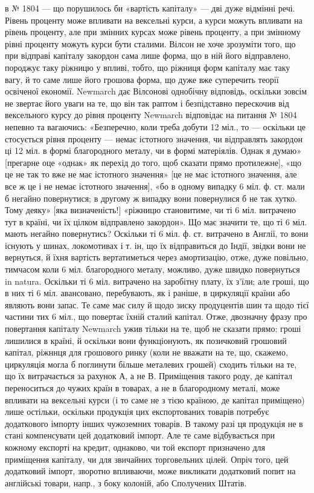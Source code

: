 \parcont{}  %
в № 1804 — що порушилось би «вартість капіталу» — дві дуже відмінні речі.
Рівень проценту може впливати на вексельні курси, а курси можуть впливати
на рівень проценту, але при змінних курсах може рівень проценту, а при змінному
рівні проценту можуть курси бути сталими. Вілсон не хоче зрозуміти того,
що при відправі капіталу закордон сама лише форма, що в ній його відправлено,
породжує таку ріжницю у впливі, тобто, що ріжниця форм капіталу має таку
вагу, й то саме лише його грошова форма, що дуже вже суперечить теорії
освіченої економії. Newmarch дає Вілсонові однобічну відповідь, оскільки зовсім
не звертає його уваги на те, що він так раптом і безпідставно перескочив від вексельного
курсу до рівня проценту Newmarch відповідає на питання № 1804
непевно та вагаючись: «Безперечно, коли треба добути 12 міл., то — оскільки
це стосується рівня проценту — немає істотного значення, чи відправлять
закордон ці 12 міл. в формі благородного металу, чи в формі матеріялів.
Однак я думаю» [прегарне оце «однак» як перехід до того, щоб сказати прямо
протилежне], «що це не так то вже не має істотного значення» [це не має істотного
значення, але все ж це і не немає істотного значення], «бо в одному
випадку 6 міл. ф. ст. мали б негайно повернутися; в другому ж випадку вони
повернулися б не так хутко. Тому деяку» [яка визначеність!] «ріжницю становитиме,
чи ті 6 міл. витрачено тут в країні, чи їх цілком відправлено закордон».
Що має значити те, що ті 6 міл. мають негайно повернутись? Оскільки
ті 6 міл. ф. ст. витрачено в Англії, то вони існують у шинах, локомотивах і т. ін,
що їх відправиться до Індії, звідки вони не вернуться, й їхня вартість вертатиметься
через амортизацію, отже, дуже повільно, тимчасом коли 6 міл. благородного
металу, можливо, дуже швидко повернуться in natura. Оскільки ті 6 міл.
витрачено на заробітну плату, їх з’їли; але гроші, що в них ті 6 міл. авансовано,
перебувають, як і раніше, в циркуляції країни або являють вони запас.
Те саме має силу й щодо зиску продуцентів шин та щодо тієї частини тих 6 міл.,
що повертає їхній сталий капітал. Отже, двозначну фразу про повертання
капіталу Newmarch ужив тільки на те, щоб не сказати прямо: гроші лишилися
в країні, й оскільки вони функціонують, як позичковий грошовий капітал, ріжннця
для грошового ринку (коли не вважати на те, що, скажемо, циркуляція
могла б поглинути більше металевих грошей) сходить тільки на те, що їх витрачається
за рахунок $А$, а не $В$. Приміщення такого роду, де капітал переноситься
до чужих країн в товарах, а не в благородному металі, може впливати на вексельні
курси (і то саме не з тією країною, де капітал приміщено) лише остільки,
оскільки продукція цих експортованих товарів потребує додаткового імпорту
інших чужоземних товарів. В такому разі ця продукція не в стані компенсувати
цей додатковий імпорт. Але те саме відбувається при кожному експорті на кредит,
однаково, чи той експорт призначено для приміщення капіталу, чи для
звичайних торговельних цілей. Опріч того, цей додатковий імпорт, зворотно
впливаючи, може викликати додатковий попит на англійські товари, напр.,
з боку колоній, або Сполучених Штатів.

